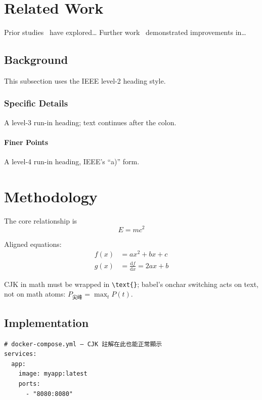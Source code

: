 \documentclass[10pt, a4paper, twocolumn]{article}
\begin{document}
\section{Related Work}
\label{sec:related}

Prior studies~\cite{ref1} have explored\ldots{} Further work~\cite{ref2}
demonstrated improvements in\ldots{}

\subsection{Background}
This subsection uses the IEEE level-2 heading style.

\subsubsection{Specific Details}
A level-3 run-in heading; text continues after the colon.

\paragraph{Finer Points}
A level-4 run-in heading, IEEE's ``a)'' form.

\section{Methodology}
\label{sec:method}

The core relationship is
\begin{equation}
E = mc^2
\label{eq:example}
\end{equation}

Aligned equations:
\begin{align}
f(x) &= ax^2 + bx + c \label{eq:quad} \\
g(x) &= \frac{\mathrm{d}f}{\mathrm{d}x} = 2ax + b \label{eq:deriv}
\end{align}

CJK in math must be wrapped in \verb|\text{}|; babel's onchar switching acts on
text, not on math atoms: $P_{\text{尖峰}} = \max_t P(t)$.

\subsection{Implementation}

\begin{Verbatim}[fontsize=\scriptsize]
# docker-compose.yml — CJK 註解在此也能正常顯示
services:
  app:
    image: myapp:latest
    ports:
      - "8080:8080"
\end{Verbatim}
\end{document}
